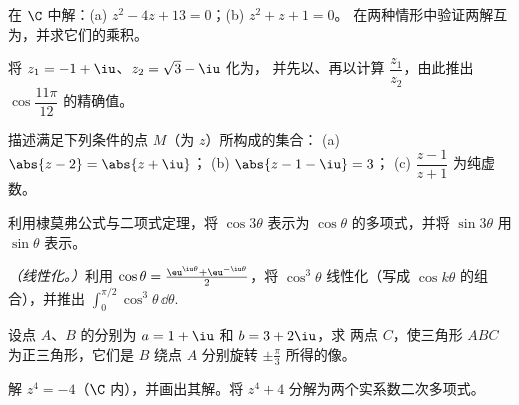\begin{exercise}[$\star$]\label{exo:g12:complex:2}
在 $\C$ 中解：(a) $z^2 - 4z + 13 = 0$；(b) $z^2 + z + 1 = 0$。
在两种情形中验证两解互为，并求它们的乘积。
\end{exercise}

\begin{exercise}[$\star$]\label{exo:g12:complex:3}
将 $z_1 = -1 + \iu$、$z_2 = \sqrt3 - \iu$ 化为，
并先以、再以计算 $\dfrac{z_1}{z_2}$，由此推出
$\cos\dfrac{11\pi}{12}$ 的精确值。
\end{exercise}

\begin{exercise}[$\star\star$]\label{exo:g12:complex:4}
描述满足下列条件的点 $M$（为 $z$）所构成的集合：
(a) $\abs{z - 2} = \abs{z + \iu}$；\quad
(b) $\abs{z - 1 - \iu} = 3$；\quad
(c) $\dfrac{z - 1}{z + 1}$ 为纯虚数。
\end{exercise}

\begin{exercise}[$\star\star$]\label{exo:g12:complex:5}
利用棣莫弗公式与二项式定理，将 $\cos 3\theta$
表示为 $\cos\theta$ 的多项式，并将 $\sin 3\theta$ 用
$\sin\theta$ 表示。
\end{exercise}

\begin{exercise}[$\star\star$]\label{exo:g12:complex:6}
\emph{（线性化。）}利用
$\cos\theta = \frac{\eu^{\iu\theta} + \eu^{-\iu\theta}}{2}$，将
$\cos^3\theta$ 线性化（写成 $\cos k\theta$ 的组合），并推出
$\displaystyle\int_0^{\pi/2}\cos^3\theta\,\dd\theta$.
\end{exercise}

\begin{exercise}[$\star\star$]\label{exo:g12:complex:7}
设点 $A$、$B$ 的分别为 $a = 1 + \iu$ 和 $b = 3 + 2\iu$，求
两点 $C$，使三角形 $ABC$ 为正三角形，它们是
$B$ 绕点 $A$ 分别旋转 $\pm\frac{\pi}{3}$ 所得的像。
\end{exercise}

\begin{exercise}[$\star\star\star$]\label{exo:g12:complex:8}
解 $z^4 = -4$（$\C$ 内），并画出其解。将
$z^4 + 4$ 分解为两个实系数二次多项式。
\end{exercise}

